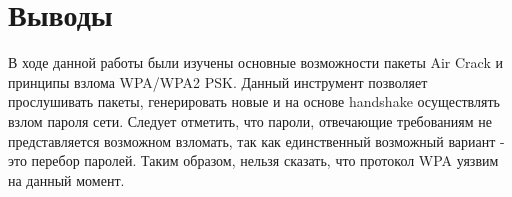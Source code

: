 \documentclass[10pt,a4paper]{article}
\begin{document}
\section{Выводы}
В ходе данной работы были изучены основные возможности пакеты Air Crack и принципы взлома WPA/WPA2 PSK. Данный инструмент позволяет прослушивать пакеты, генерировать новые и на основе handshake осуществлять взлом пароля сети. Следует отметить, что пароли, отвечающие требованиям не представляется возможном взломать, так как единственный возможный вариант - это перебор паролей. Таким образом, нельзя сказать, что протокол WPA уязвим на данный момент. 
\end{document}
